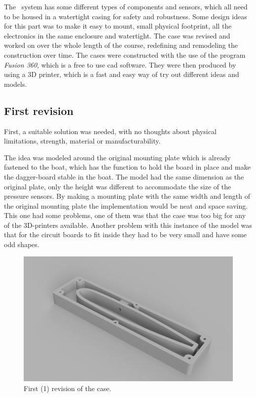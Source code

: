
The \project~system has some different types of components and sensors, which all need to be housed in a watertight casing for safety and robustness. Some design ideas for this part was to make it easy to mount, small physical footprint, all the electronics in the same enclosure and watertight.
The case was revised and worked on over the whole length of the course, redefining and remodeling the construction over time.
The cases were constructed with the use of the program \emph{Fusion 360}\cite{cad}, which is a free to use \gls{cad} software. They were then produced by using a 3D printer, which is a fast and easy way of try out different ideas and models.

\subsection{First revision}
First, a suitable solution was needed, with no thoughts about physical limitations, strength, material or manufacturability.

The idea was modeled around the original mounting plate which is already fastened to the boat, which has the function to hold the board in place and make the dagger-board stable in the boat. The model had the same dimension as the original plate, only the height was different to accommodate the size of the pressure sensors. By making a mounting plate with the same width and length of the original mounting plate the implementation would be neat and space saving.
This one had some problems, one of them was that the case was too big for any of the 3D-printers available. Another problem with this instance of the model was that for the circuit boards to fit inside they had to be very small and have some odd shapes.



\begin{figure}[H]
\begin{center}
	\includegraphics[width = .8\textwidth]{Figures/Case_rev_1.png}
	\caption{First (1) revision of the case.}
	\label{Case_rev_1}
\end{center}
\end{figure}

